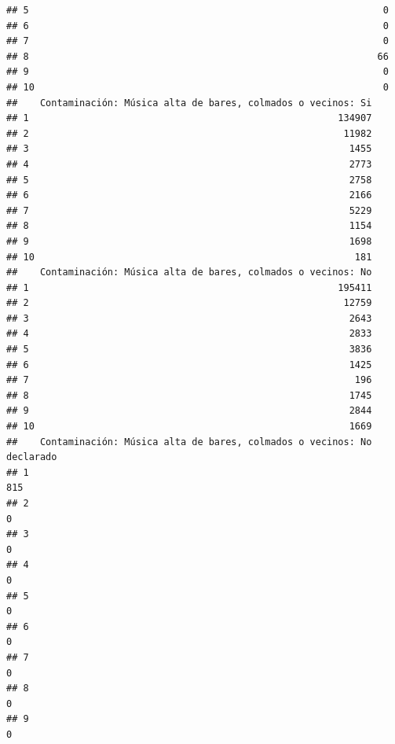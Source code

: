 \documentclass[11pt,]{article}
\begin{document}
\begin{verbatim}
## 5                                                               0
## 6                                                               0
## 7                                                               0
## 8                                                              66
## 9                                                               0
## 10                                                              0
##    Contaminación: Música alta de bares, colmados o vecinos: Si
## 1                                                       134907
## 2                                                        11982
## 3                                                         1455
## 4                                                         2773
## 5                                                         2758
## 6                                                         2166
## 7                                                         5229
## 8                                                         1154
## 9                                                         1698
## 10                                                         181
##    Contaminación: Música alta de bares, colmados o vecinos: No
## 1                                                       195411
## 2                                                        12759
## 3                                                         2643
## 4                                                         2833
## 5                                                         3836
## 6                                                         1425
## 7                                                          196
## 8                                                         1745
## 9                                                         2844
## 10                                                        1669
##    Contaminación: Música alta de bares, colmados o vecinos: No declarado
## 1                                                                    815
## 2                                                                      0
## 3                                                                      0
## 4                                                                      0
## 5                                                                      0
## 6                                                                      0
## 7                                                                      0
## 8                                                                      0
## 9                                                                      0

\end{verbatim}
\end{document}
